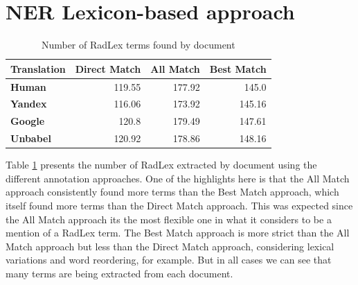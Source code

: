 \label{chap4}




\section{NER Lexicon-based approach}

\begin{table}[ht]
    \centering
    \begin{tabular}{lrrr}
    \toprule
    \textbf{Translation}   &   \textbf{Direct Match} &   \textbf{All Match} &   \textbf{Best Match} \\
    \midrule
     \textbf{Human}         &         119.55 &      177.92 &       145.0 \\

     \textbf{Yandex}        &         116.06 &      173.92 &       145.16 \\

     \textbf{Google}        &         120.8 &      179.49 &       147.61 \\

     \textbf{Unbabel}       &         120.92 &      178.86 &       148.16 \\

    \bottomrule
    \end{tabular} 
    \caption{Number of RadLex terms found by document}
    \label{table:terms_by_document}
\end{table}

Table \ref{table:terms_by_document} presents the number of RadLex extracted by document using the different annotation approaches. One of the highlights here is that the All Match approach consistently found more terms than the Best Match approach, which itself found more terms than the Direct Match approach. This was expected since the All Match approach its the most flexible one in what it considers to be a mention of a RadLex term. The Best Match approach is more strict than the All Match approach but less than the Direct Match approach, considering lexical variations and word reordering, for example. But in all cases we can see that many terms are being extracted from each document.


